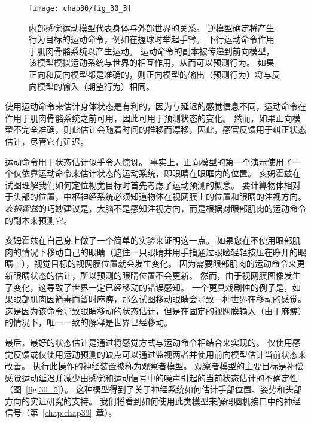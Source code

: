 \begin{figure}[htbp]
	\centering
	\texttt{[image: chap30/fig\_30\_3]}
	\caption{内部感觉运动模型代表身体与外部世界的关系。
		逆模型确定将产生行为目标的运动命令，例如在握球时举起手臂。
		下行运动命令作用于肌肉骨骼系统以产生运动。
		运动命令的副本被传递到前向模型，该模型模拟运动系统与世界的相互作用，从而可以预测行为。
		如果正向和反向模型都是准确的，则正向模型的输出（预测行为）将与反向模型的输入（期望行为）相同。}
	\label{fig:30_3}
\end{figure}


使用运动命令来估计身体状态是有利的，因为与延迟的感觉信息不同，运动命令在作用于肌肉骨骼系统之前可用，因此可用于预测状态的变化。
然而，如果正向模型不完全准确，则此估计会随着时间的推移而漂移，因此，感官反馈用于纠正状态估计，尽管它有延迟。


运动命令用于状态估计似乎令人惊讶。
事实上，正向模型的第一个演示使用了一个仅依靠运动命令来估计状态的运动系统，即眼睛在眼眶内的位置。
亥姆霍兹在试图理解我们如何定位视觉目标时首先考虑了运动预测的概念。
要计算物体相对于头部的位置，中枢神经系统必须知道物体在视网膜上的位置和眼睛的注视方向。
\textit{亥姆霍兹}的巧妙建议是，大脑不是感知注视方向，而是根据对眼部肌肉的运动命令的副本来预测它。


亥姆霍兹在自己身上做了一个简单的实验来证明这一点。
如果您在不使用眼部肌肉的情况下移动自己的眼睛（遮住一只眼睛并用手指通过眼睑轻轻按压在睁开的眼睛上），视觉目标的视网膜位置就会发生变化。
因为需要眼部肌肉的运动命令来更新眼睛状态的估计，所以预测的眼睛位置不会更新。
然而，由于视网膜图像发生了变化，这导致了世界一定已经移动的错误感知。
一个更具戏剧性的例子是，如果眼部肌肉因箭毒而暂时麻痹，那么试图移动眼睛会导致一种世界在移动的感觉。
这是因为该命令导致眼睛移动的状态估计，但是在固定的视网膜输入（由于麻痹）的情况下，唯一一致的解释是世界已经移动。


最后，最好的状态估计是通过将感觉方式与运动命令相结合来实现的。
仅使用感觉反馈或仅使用运动预测的缺点可以通过监视两者并使用前向模型估计当前状态来改善。
执行此操作的神经装置被称为观察者模型。
观察者模型的主要目标是补偿感觉运动延迟并减少由感觉和运动信号中的噪声引起的当前状态估计的不确定性（图~\ref{fig:30_5}）。
这种模型得到了关于神经系统如何估计手部位置、姿势和头部方向的实证研究的支持。
我们将看到如何使用此类模型来解码脑机接口中的神经信号（第~\ref{chap:chap39}~章）。


